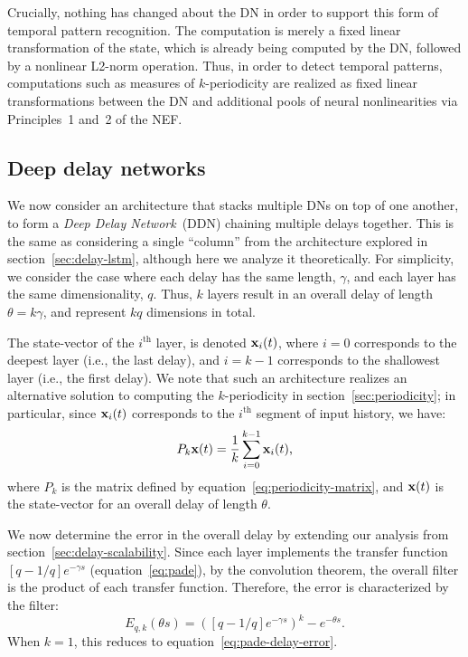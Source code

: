 Crucially, nothing has changed about the DN in order to support this form of temporal pattern recognition.
The computation is merely a fixed linear transformation of the state, which is already being computed by the DN, followed by a nonlinear L2-norm operation.
Thus, in order to detect temporal patterns, computations such as measures of $k$-periodicity are realized as fixed linear transformations between the DN and additional pools of neural nonlinearities via Principles~1 and~2 of the NEF.

\subsection{Deep delay networks}
\label{sec:deep-delay-networks}

We now consider an architecture that stacks multiple DNs on top of one another, to form a \emph{Deep Delay Network}~(DDN) chaining multiple delays together.
This is the same as considering a single ``column'' from the architecture explored in section~\ref{sec:delay-lstm}, although here we analyze it theoretically.
For simplicity, we consider the case where each delay has the same length, $\gamma$, and each layer has the same dimensionality, $q$.
Thus, $k$ layers result in an overall delay of length $\theta = k \gamma$, and represent $k q$ dimensions in total.

The state-vector of the $i^\text{th}$ layer, is denoted $\mathbf{x}_i(t)$, where $i=0$ corresponds to the deepest layer (i.e., the last delay), and $i=k-1$ corresponds to the shallowest layer (i.e., the first delay).
We note that such an architecture realizes an alternative solution to computing the $k$-periodicity in section~\ref{sec:periodicity}; in particular, since $\mathbf{x}_i(t)$ corresponds to the $i^\text{th}$ segment of input history, we have:
\begin{equation*}
P_k \mathbf{x}(t) = \frac{1}{k} \sum_{i=0}^{k-1} \mathbf{x}_i(t) \text{,}
\end{equation*}
where $P_k$ is the matrix defined by equation~\ref{eq:periodicity-matrix}, and $\mathbf{x}(t)$ is the state-vector for an overall delay of length $\theta$.

We now determine the error in the overall delay by extending our analysis from section~\ref{sec:delay-scalability}.
Since each layer implements the transfer function $[q-1/q]e^{-\gamma s}$ (equation~\ref{eq:pade}), by the convolution theorem, the overall filter is the product of each transfer function.
Therefore, the error is characterized by the filter:
\begin{equation} \label{eq:deep-delay-network-error}
E_{q,k}(\theta s) = \left( [q-1/q]e^{-\gamma s} \right)^k - e^{-\theta s} \text{.}
\end{equation}
When $k = 1$, this reduces to equation~\ref{eq:pade-delay-error}.

